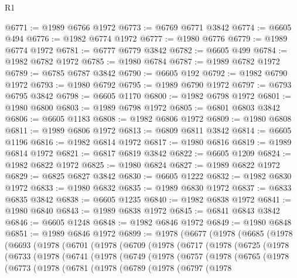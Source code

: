 \begin{lexlean}{R1}
\begin{coremodule}
@6771 := @1989 @6766 @1972
@6773 := @6769 @6771 @3842
@6774 := @6605 @494
@6776 := @1982 @6774 @1972
@6777 := @1980 @6776
@6779 := @1989 @6774 @1972
@6781 := @6777 @6779 @3842
@6782 := @6605 @499
@6784 := @1982 @6782 @1972
@6785 := @1980 @6784
@6787 := @1989 @6782 @1972
@6789 := @6785 @6787 @3842
@6790 := @6605 @192
@6792 := @1982 @6790 @1972
@6793 := @1980 @6792
@6795 := @1989 @6790 @1972
@6797 := @6793 @6795 @3842
@6798 := @6605 @1170
@6800 := @1982 @6798 @1972
@6801 := @1980 @6800
@6803 := @1989 @6798 @1972
@6805 := @6801 @6803 @3842
@6806 := @6605 @1183
@6808 := @1982 @6806 @1972
@6809 := @1980 @6808
@6811 := @1989 @6806 @1972
@6813 := @6809 @6811 @3842
@6814 := @6605 @1196
@6816 := @1982 @6814 @1972
@6817 := @1980 @6816
@6819 := @1989 @6814 @1972
@6821 := @6817 @6819 @3842
@6822 := @6605 @1209
@6824 := @1982 @6822 @1972
@6825 := @1980 @6824
@6827 := @1989 @6822 @1972
@6829 := @6825 @6827 @3842
@6830 := @6605 @1222
@6832 := @1982 @6830 @1972
@6833 := @1980 @6832
@6835 := @1989 @6830 @1972
@6837 := @6833 @6835 @3842
@6838 := @6605 @1235
@6840 := @1982 @6838 @1972
@6841 := @1980 @6840
@6843 := @1989 @6838 @1972
@6845 := @6841 @6843 @3842
@6846 := @6605 @1248
@6848 := @1982 @6846 @1972
@6849 := @1980 @6848
@6851 := @1989 @6846 @1972
@6899 := @1978
    (@6677
      (@1978
        (@6685
          (@1978
            (@6693
              (@1978
                (@6701
                  (@1978
                    (@6709
                      (@1978
                        (@6717
                          (@1978
                            (@6725
                              (@1978
                                (@6733
                                  (@1978
                                    (@6741
                                      (@1978
                                        (@6749
                                          (@1978
                                            (@6757
                                              (@1978
                                                (@6765
                                                  (@1978
                                                    (@6773
                                                      (@1978
                                                        (@6781
                                                          (@1978
                                                            (@6789
                                                              (@1978
                                                                (@6797
                                                                  (@1978

\end{coremodule}
\end{lexlean}

